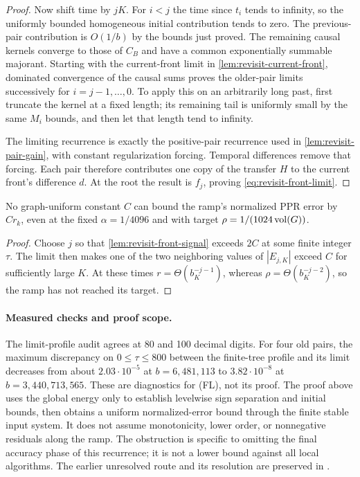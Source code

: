\begin{proof}
Now shift time by $jK$. For $i<j$ the time since $t_i$ tends to infinity,
so the uniformly bounded homogeneous initial contribution tends to zero.
The previous-pair contribution is $O(1/b)$ by the bounds just proved.
The remaining causal kernels converge to those of $C_B$ and have a common
exponentially summable majorant. Starting with the current-front limit in
\cref{lem:revisit-current-front}, dominated convergence of the causal
sums proves the older-pair limits successively for $i=j-1,\ldots,0$.
To apply this on an arbitrarily long past, first truncate the kernel at
a fixed length; its remaining tail is uniformly small by the same
$M_i$ bounds, and then let that length tend to infinity.

The limiting recurrence is exactly the positive-pair recurrence used in
\cref{lem:revisit-pair-gain}, with constant regularization forcing.
Temporal differences remove that forcing. Each pair therefore contributes
one copy of the transfer $H$ to the current front's difference $d$.
At the root the result is $f_j$, proving
\cref{eq:revisit-front-limit}.
\end{proof}

\begin{corollary}
\label{cor:revisit-unbounded-tracking}
No graph-uniform constant $C$ can bound the ramp's normalized PPR error
by $Cr_k$, even at the fixed
$\alpha=1/4096$ and with target $\rho=1/(1024\operatorname{vol}(G))$.
\end{corollary}
\begin{proof}
Choose $j$ so that \cref{lem:revisit-front-signal} exceeds $2C$ at some
finite integer $\tau$. The limit then makes one of the two neighboring
values of $|E_{j,K}|$ exceed $C$ for sufficiently large $K$.
At these times $r=\Theta(b_K^{-j-1})$, whereas
$\rho=\Theta(b_K^{-j-2})$, so the ramp has not reached its target.
\end{proof}

\paragraph{Measured checks and proof scope.}
The limit-profile audit agrees at 80 and 100 decimal digits. For four
old pairs, the maximum discrepancy on $0\leq\tau\leq800$ between the
finite-tree profile and its limit decreases from about $2.03\cdot10^{-5}$
at $b=6{,}481{,}113$ to $3.82\cdot10^{-8}$ at $b=3{,}440{,}713{,}565$.
These are diagnostics for (FL), not its proof. The proof above uses the
global energy only to establish levelwise sign separation and initial
bounds, then obtains a uniform normalized-error bound through the finite
stable input system. It does not assume monotonicity, lower order, or
nonnegative residuals along the ramp. The obstruction is specific to
omitting the final accuracy phase of this recurrence; it is not a lower
bound against all local algorithms. The earlier unresolved route and its
resolution are preserved in .
